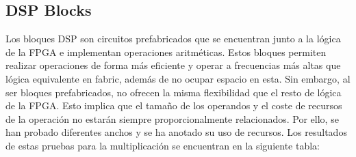 \subsection{DSP Blocks}
Los bloques DSP son circuitos prefabricados que se encuentran junto a la lógica de la FPGA e implementan operaciones aritméticas. Estos bloques permiten realizar operaciones de forma más eficiente y operar a frecuencias más altas que lógica equivalente en fabric, además de no ocupar espacio en esta. Sin embargo, al ser bloques prefabricados, no ofrecen la misma flexibilidad que el resto de lógica de la FPGA. Esto implica que el tamaño de los operandos y el coste de recursos de la operación no estarán siempre proporcionalmente relacionados. Por ello, se han probado diferentes anchos y se ha anotado su uso de recursos. Los resultados de estas pruebas para la multiplicación se encuentran en la siguiente tabla:

